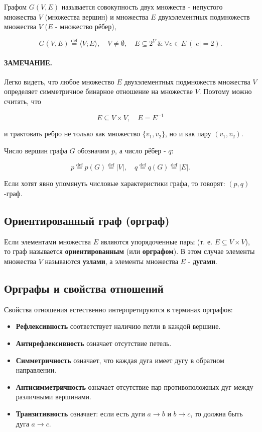 {Графом $G(V, E)$ называется совокупность двух множеств - непустого множества $V$ (множества вершин) и множества $E$ двухэлементных подмножеств множества $V$ ($E$ - множество рёбер),


\[
G(V, E) \overset{\text{def}}{=} \langle V; E \rangle,\quad V \neq \emptyset,\quad E \subseteq 2^V\ \&\ \forall e \in E\ (|e| = 2).
\]



\paragraph{ЗАМЕЧАНИЕ.}
Легко видеть, что любое множество $E$ двухэлементных подмножеств множества $V$ определяет симметричное бинарное отношение на множестве $V$. Поэтому можно считать, что


\[
E \subseteq V \times V,\quad E = E^{-1}
\]


и трактовать ребро не только как множество $\{v_1, v_2\}$, но и как пару $(v_1, v_2)$.

\smallskip

Число вершин графа $G$ обозначим $p$, а число рёбер - $q$:


\[
p \overset{\text{def}}{=} p(G) \overset{\text{def}}{=} |V|,\quad q \overset{\text{def}}{=} q(G) \overset{\text{def}}{=} |E|.
\]



Если хотят явно упомянуть числовые характеристики графа, то говорят: $(p, q)$-граф.


\subsection*{Ориентированный граф (орграф)}

Если элементами множества $E$ являются упорядоченные пары (т. е. $E \subseteq V \times V$), то граф называется \textbf{ориентированным} (или \textbf{орграфом}). В этом случае элементы множества $V$ называются \textbf{узлами}, а элементы множества $E$ - \textbf{дугами}.


\subsection*{Орграфы и свойства отношений}

Свойства отношения естественно интерпретируются в терминах орграфов:

\begin{itemize}
    \item \textbf{Рефлексивность} соответствует наличию петли в каждой вершине.
    \item \textbf{Антирефлексивность} означает отсутствие петель.
    \item \textbf{Симметричность} означает, что каждая дуга имеет дугу в обратном направлении.
    \item \textbf{Антисимметричность} означает отсутствие пар противоположных дуг между различными вершинами.
    \item \textbf{Транзитивность} означает: если есть дуги $a \to b$ и $b \to c$, то должна быть дуга $a \to c$.
\end{itemize}

}
